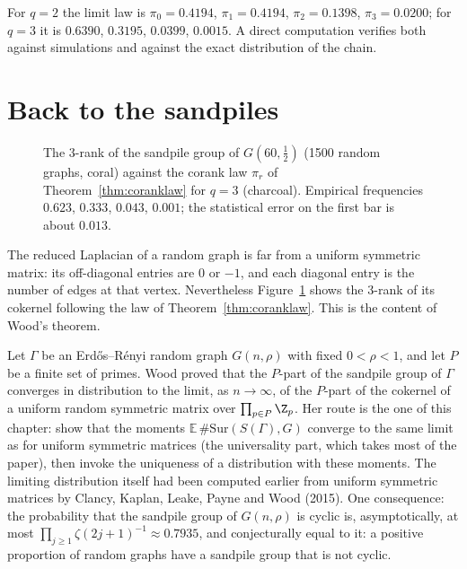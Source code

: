 For $q=2$ the limit law is $\pi_0=0.4194$, $\pi_1=0.4194$, $\pi_2=0.1398$, $\pi_3=0.0200$; for $q=3$ it is $0.6390$, $0.3195$, $0.0399$, $0.0015$. A direct computation verifies both against simulations and against the exact distribution of the chain.

\section{Back to the sandpiles}

\begin{figure}[ht]\centering{}
\caption{The $3$-rank of the sandpile group of $G(60,\frac12)$ (1500 random graphs, coral) against the corank law $\pi_r$ of Theorem~\ref{thm:coranklaw} for $q=3$ (charcoal). Empirical frequencies $0.623$, $0.333$, $0.043$, $0.001$; the statistical error on the first bar is about $0.013$.}
\label{fig:sandpile}
\end{figure}

The reduced Laplacian of a random graph is far from a uniform symmetric matrix: its off-diagonal entries are $0$ or $-1$, and each diagonal entry is the number of edges at that vertex. Nevertheless Figure~\ref{fig:sandpile} shows the $3$-rank of its cokernel following the law of Theorem~\ref{thm:coranklaw}. This is the content of Wood's theorem.

\begin{remark}\label{rem:woodsandpile}
Let $\Gamma$ be an Erd\H os--R\'enyi random graph $G(n,\rho)$ with fixed $0<\rho<1$, and let $P$ be a finite set of primes. Wood proved that the $P$-part of the sandpile group of $\Gamma$ converges in distribution to the limit, as $n\to\infty$, of the $P$-part of the cokernel of a uniform random symmetric matrix over $\prod_{p\in P}\Z_p$. Her route is the one of this chapter: show that the moments $\mathbb E\,\#\mathrm{Sur}(S(\Gamma),G)$ converge to the same limit as for uniform symmetric matrices (the universality part, which takes most of the paper), then invoke the uniqueness of a distribution with these moments. The limiting distribution itself had been computed earlier from uniform symmetric matrices by Clancy, Kaplan, Leake, Payne and Wood (2015). One consequence: the probability that the sandpile group of $G(n,\rho)$ is cyclic is, asymptotically, at most $\prod_{j\ge1}\zeta(2j+1)^{-1}\approx0.7935$, and conjecturally equal to it: a positive proportion of random graphs have a sandpile group that is not cyclic.
\end{remark}

